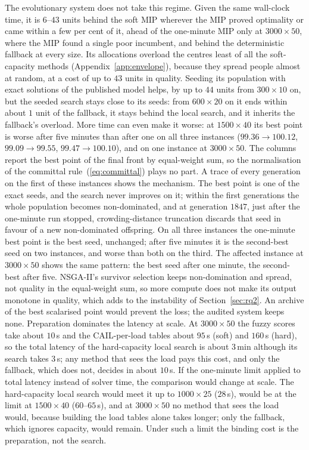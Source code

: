\documentclass[systems,article,accept,moreauthors,pdftex]{Definitions/mdpi}
\begin{document}
The evolutionary system does not take this regime. Given the same wall-clock time, it is
$6$--$43$ units behind the soft MIP wherever the MIP proved optimality or came within a few
per cent of it, ahead of the one-minute MIP only at $3000\times50$, where the MIP found a single
poor incumbent, and behind the deterministic fallback at every size. Its allocations overload the
centres least of all the soft-capacity methods (Appendix~\ref{app:envelope}), because they spread
people almost at random, at a cost of up to $43$ units in quality. Seeding its population with exact solutions of the
published model helps, by up to $44$ units from $300\times10$ on, but the seeded search stays
close to its seeds: from $600\times20$ on it ends within about $1$ unit of the fallback, it stays
behind the local search, and it inherits the fallback's overload. More time can even make it
worse: at $1500\times40$ its best point is worse after five minutes than after one on all three
instances ($99.36 \to 100.12$, $99.09 \to 99.55$, $99.47 \to 100.10$), and on one instance at
$3000\times50$. The columns report the best point of the final front by equal-weight sum, so the
normalisation of the committal rule~(\ref{eq:committal}) plays no part. A trace of every generation on
the first of these instances shows the mechanism. The best point is one of the exact seeds, and
the search never improves on it; within the first generations the whole population becomes non-dominated,
and at generation $1847$, just after the one-minute run stopped, crowding-distance truncation
discards that seed in favour of a new non-dominated offspring. On all three instances the
one-minute best point is the best seed, unchanged; after five minutes it is the second-best seed
on two instances, and worse than both on the third. The affected instance at $3000\times50$ shows
the same pattern: the best seed after one minute, the second-best after five. NSGA-II's survivor selection keeps non-domination and spread, not quality
in the equal-weight sum, so more compute does not make its output monotone in quality, which adds to
the instability of Section~\ref{sec:rq2}. An archive of the best scalarised point would prevent
the loss; the audited system keeps none. Preparation dominates the
latency at scale. At $3000\times50$ the fuzzy scores take about $10$\,s and the CAIL-per-load
tables about $95$\,s (soft) and $160$\,s (hard), so the total latency of the hard-capacity local
search is about $3$\,min although its search takes $3$\,s; any method that sees the load pays this
cost, and only the fallback, which does not, decides in about $10$\,s. If the one-minute limit
applied to total latency instead of solver time, the comparison would change at scale. The
hard-capacity local search would meet it up to $1000\times25$ ($28$\,s), would be at the limit at
$1500\times40$ ($60$--$65$\,s), and at $3000\times50$ no method that sees the load would, because building the load
tables alone takes longer; only the fallback, which ignores capacity, would remain. Under such a
limit the binding cost is the preparation, not the search.
\end{document}
